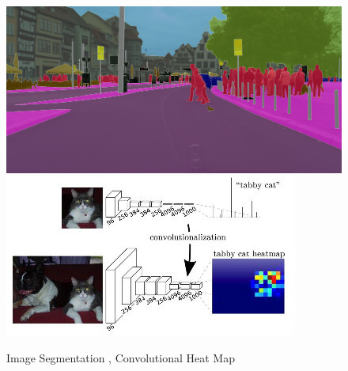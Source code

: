 \documentclass[11pt,twoside]{report}
\begin{document}
\noindent \begin{figure}[h!]
	\includegraphics[width = 0.5\hsize]{./figures/image_seg1.png}
	\includegraphics[width = 0.5\hsize]{./figures/sem_im_seg1.jpg}
	\caption{Image Segmentation \cite{DBLP:journals/corr/CordtsORREBFRS16}, Convolutional Heat Map \cite{DBLP:journals/corr/LongSD14}}
	\label{cityscapes_data}
\end{figure}
\end{document}
